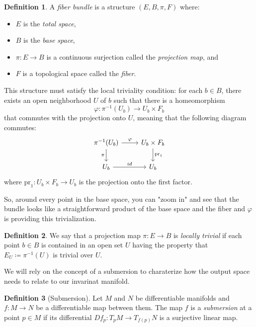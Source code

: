 \documentclass{article} %
\newcounter{ct}
\theoremstyle{definition}
\newtheorem{definition}{Definition}
\theoremstyle{remark}
\begin{document}
\begin{definition}
A \emph{fiber bundle} is a structure \((E, B, \pi, F)\) where:
\begin{itemize}
    \item \(E\) is the \emph{total space},
    \item \(B\) is the \emph{base space},
    \item \(\pi: E \to B\) is a continuous surjection called the \emph{projection map}, and
    \item \(F\) is a topological space called the \emph{fiber}.
\end{itemize}
This structure must satisfy the local triviality condition: for each \(b \in B\), there exists an open neighborhood \(U\) of \(b\) such that there is a homeomorphism 
\[
\varphi: \pi^{-1}(U_{b}) \to U_{b} \times F_{b}
\]
that commutes with the projection onto \(U\), meaning that the following diagram commutes:
\begin{equation*}
    \begin{tikzcd}
        \pi^{-1}(U_{b}) \arrow[rightarrow]{r}{\varphi}	\arrow[swap]{d}{\pi} & U_{b} \times F_{b}	\arrow[rightarrow]{d}{\operatorname{pr}_{1}} 	\\
        U_{b} \arrow[rightarrow]{r}{id}  &	 	U_{b}
      \end{tikzcd}
\end{equation*}
where \(\text{pr}_1: U_{b} \times F_{b} \to U_{b}\) is the projection onto the first factor.
\end{definition}

So, around every point in the base space, you can "zoom in" and see that the bundle looks like a straightforward product of the base space and the fiber and \(\varphi\) is providing this trivialization.

\begin{definition}
We say that a projection map \(\pi:E \rightarrow  B\) is \emph{locally trivial} if each point \(b \in B\) is contained in an open set \(U\) having the property that \(E_U\coloneqq \pi^{-1}(U)\) is trivial over \(U\).
\end{definition}

We will rely on the concept of a submersion to charaterize how the output space needs to relate to our invarinat manifold.
\begin{definition}[Submersion]
Let \(M\) and \(N\) be differentiable manifolds and \(f\colon M\to N\) be a differentiable map between them.
 The map \(f\) is a \emph{submersion} at a point \(p\in M\) if its differential \(Df_{p}\colon T_{p}M\to T_{f(p)}N\) is a surjective linear map.
\end{definition}
\end{document}
